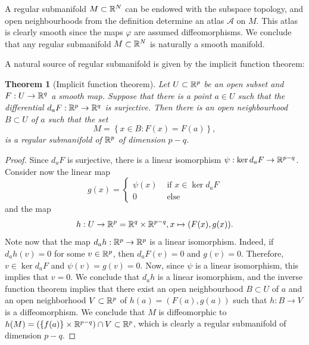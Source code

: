 \documentclass[11pt,a4paper]{book}
\newtheorem{thm}{Theorem}[section]
\theoremstyle{remark} \newtheorem{rmk}[thm]{Remark}
\theoremstyle{definition} \newtheorem{defn}[thm]{Definition}
\theoremstyle{definition} \newtheorem{ex}[thm]{Example}
\theoremstyle{definition} \newtheorem{ej}[thm]{Exercise}
\begin{document}
A regular submanifold $M\subset \mathbb R^N$ can be endowed with the subspace topology, and open neighbourhoods from the definition determine an atlas $\mathcal{A}$ on $M$. This atlas is clearly smooth since the maps $\varphi$ are assumed diffeomorphisms. We conclude that any regular submanifold $M\subset \mathbb R^N$ is naturally a smooth manifold.

A natural source of regular submanifold is given by the implicit function theorem:

\begin{thm}[Implicit function theorem]
  Let $U\subset \mathbb R^p$ be an open subset and $F:U\rightarrow \mathbb R^q$ a smooth map. Suppose that there is a point $a\in U$ such that the differential $d_aF:\mathbb R^p\rightarrow \mathbb R^q$ is surjective. Then there is an open neighbourhood $B\subset U$ of $a$ such that the set
  \begin{equation*}
M=\left\{ x \in B: F(x)=F(a) \right\},
  \end{equation*}
is a regular submanifold of $\mathbb R^p$ of dimension $p-q$.
\end{thm}

\begin{proof}
  Since $d_a F$ is surjective, there is a linear isomorphism $\psi:\ker d_a F \rightarrow \mathbb R^{p-q}$. Consider now the linear map
  \begin{equation*}
    g(x)=
    \begin{cases}
\psi(x) & \text{ if } x\in \ker d_a F \\
      0 & \text{ else }
\end{cases}
  \end{equation*}
  and the map
  \begin{equation*}
h:U \rightarrow \mathbb R^p=\mathbb R^q \times \mathbb R^{p-q}, x \mapsto (F(x),g(x)).
  \end{equation*}
  Note now that the map $d_a h:\mathbb R^p \rightarrow \mathbb R^p$ is a linear isomorphism. Indeed, if $d_ah(v)=0$ for some $v\in \mathbb R^p$, then $d_aF(v)=0$ and $g(v)=0$. Therefore, $v\in \ker d_a F$ and $\psi(v)=g(v)=0$. Now, since $\psi$ is a linear isomorphism, this implies that $v=0$. We conclude that $d_ah$ is a linear isomorphism, and the inverse function theorem implies that there exist an open neighbourhood $B\subset U$ of $a$ and an open neighborhood $V\subset \mathbb R^p$ of $h(a)=(F(a),g(a))$ such that $h:B\rightarrow V$ is a diffeomorphism. We conclude that $M$ is diffeomorphic to $h(M)=(\left\{ f(a) \right\} \times \mathbb R^{p-q}) \cap V \subset \mathbb R^p$, which is clearly a regular submanifold of dimension $p-q$.
\end{proof}
\end{document}
